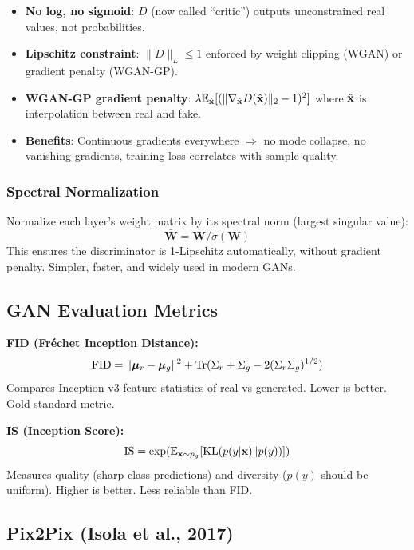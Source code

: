 \begin{keybox}
\begin{itemize}
\item \textbf{No log, no sigmoid}: $D$ (now called ``critic'') outputs unconstrained real values, not probabilities.
\item \textbf{Lipschitz constraint}: $\|D\|_L \leq 1$ enforced by weight clipping (WGAN) or gradient penalty (WGAN-GP).
\item \textbf{WGAN-GP gradient penalty}: $\lambda\mathbb{E}_{\hat{\mathbf{x}}}[(\|\nabla_{\hat{\mathbf{x}}}D(\hat{\mathbf{x}})\|_2 - 1)^2]$ where $\hat{\mathbf{x}}$ is interpolation between real and fake.
\item \textbf{Benefits}: Continuous gradients everywhere $\Rightarrow$ no mode collapse, no vanishing gradients, training loss correlates with sample quality.
\end{itemize}
\end{keybox}

\subsubsection{Spectral Normalization}
Normalize each layer's weight matrix by its spectral norm (largest singular value):
$$\bar{\mathbf{W}} = \mathbf{W}/\sigma(\mathbf{W})$$
This ensures the discriminator is 1-Lipschitz automatically, without gradient penalty. Simpler, faster, and widely used in modern GANs.

\subsection{GAN Evaluation Metrics}

\textbf{FID (Fr\'echet Inception Distance):}
\begin{equation}
\text{FID} = \|\boldsymbol{\mu}_r - \boldsymbol{\mu}_g\|^2 + \text{Tr}(\Sigma_r + \Sigma_g - 2(\Sigma_r\Sigma_g)^{1/2})
\end{equation}
Compares Inception v3 feature statistics of real vs generated. Lower is better. Gold standard metric.

\textbf{IS (Inception Score):}
\begin{equation}
\text{IS} = \exp(\mathbb{E}_{\mathbf{x} \sim p_g}[\text{KL}(p(y|\mathbf{x}) \| p(y))])
\end{equation}
Measures quality (sharp class predictions) and diversity ($p(y)$ should be uniform). Higher is better. Less reliable than FID.

\subsection{Pix2Pix (Isola et al., 2017)}

